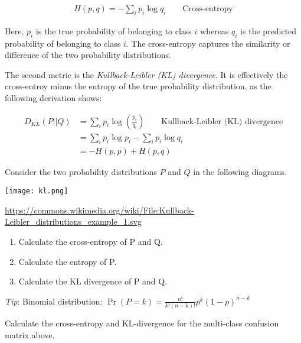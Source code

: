 \begin{align*}
H(p, q) = - \sum_i p_i \log q_i \qquad \text{Cross-entropy}
\end{align*}

\noindent Here, $p_i$ is the true probability of belonging to class $i$ whereas $q_i$ is the predicted probability of belonging to class $i$. The cross-entropy captures the similarity or difference of the two probability distributions.

The second metric is the \emph{Kullback-Leibler (KL) divergence}. It is effectively the cross-entroy minus the entropy of the true probability distribution, as the following derivation shows:

\begin{align*}
D_{KL}(P || Q) &= \sum_i p_i \log \left( \frac{p_i}{q_i} \right) \qquad \text{Kullback-Leibler (KL) divergence}\\
  & = \sum_i p_i \log p_i - \sum_i p_i \log q_i \\
  & = - H(p, p) + H(p, q)
\end{align*}

\begin{exercisebox}
Consider the two probability distributions $P$ and $Q$ in the following diagrams. \begin{center}
\texttt{[image: kl.png]}

\tiny \url{https://commons.wikimedia.org/wiki/File:Kullback-Leibler_distributions_example_1.svg}
\normalsize
\end{center}

\begin{enumerate}
   \item Calculate the cross-entropy of P and Q.
   \item Calculate the entropy of P.
   \item Calculate the KL divergence of P and Q.
\end{enumerate}

\vspace{\baselineskip}
\emph{Tip}: Binomial distribution: $\Pr(P=k) = \frac{n!}{k!(n-k)!} p^k (1-p)^{n-k}$ \\
\end{exercisebox}

\begin{exercisebox}
Calculate the cross-entropy and KL-divergence for the multi-class confusion matrix above.
\end{exercisebox}

